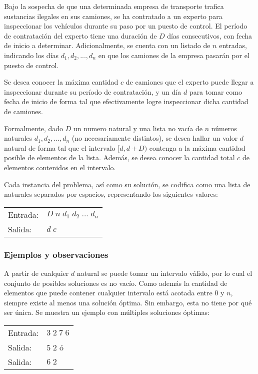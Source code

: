 Bajo la sospecha de que una determinada empresa de transporte trafica sustancias ilegales en sus camiones, se ha contratado a un experto para inspeccionar los vehículos durante su paso por un puesto de control. El período de contratación del experto tiene una duración de $D$ días consecutivos, con fecha de inicio a determinar. Adicionalmente, se cuenta con un listado de $n$ entradas, indicando los días $d_1, d_2, ..., d_n$ en que los camiones de la empresa pasarán por el puesto de control.

Se desea conocer la máxima cantidad $c$ de camiones que el experto puede llegar a inspeccionar durante su período de contratación, y un día $d$ para tomar como fecha de inicio de forma tal que efectivamente logre inspeccionar dicha cantidad de camiones.

Formalmente, dado $D$ un numero natural y una lista no vacía de $n$ números naturales $d_1, d_2, ..., d_n$ (no necesariamente distintos), se desea hallar un valor $d$ natural de forma tal que el intervalo $[d, d + D)$ contenga a la máxima cantidad posible de elementos de la lista. Además, se desea conocer la cantidad total $c$ de elementos contenidos en el intervalo.

Cada instancia del problema, así como su solución, se codifica como una lista de naturales separados por espacios, representando los siguientes valores:

\begin{tabular}{ll}
Entrada: &$D\;n\;d_1\;d_2\;...\;d_n$ \\
Salida:  &$d\;c$
\end{tabular}

\subsubsection{Ejemplos y observaciones}

A partir de cualquier $d$ natural se puede tomar un intervalo válido, por lo cual el conjunto de posibles soluciones es no vacío. Como además la cantidad de elementos que puede contener cualquier intervalo está acotada entre $0$ y $n$, siempre existe al menos una solución óptima. Sin embargo, esta no tiene por qué ser única. Se muestra un ejemplo con múltiples soluciones óptimas:

\begin{tabular}{ll}
Entrada: &$3\;2\;7\;6$            \\
Salida:  &$5\;2$ \hspace{10mm} ó  \\
Salida:  &$6\;2$ \hspace{10mm}
\end{tabular}

